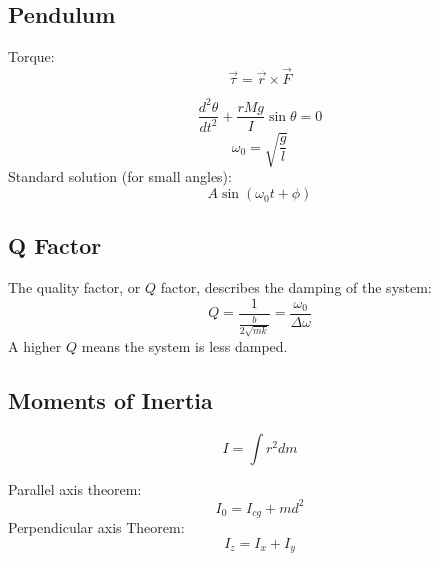 \documentclass[12pt,a4paper]{article}
\begin{document}
	\subsection*{Pendulum}
	
	Torque:
	\[ \vec{\tau} = \vec{r} \times \vec{F}\]
	
	\[
	 \frac{d^2 \theta}{dt^2} + \frac{rMg}{I} \sin\theta = 0
	\]
	\[ \omega_0 = \sqrt{\frac{g}{l}}\]
	Standard solution (for small angles): \[ A \sin(\omega_0 t + \phi)\] 
	
	
	
	\subsection*{Q Factor}
	The quality factor, or \( Q \) factor, describes the damping of the system:
	\[
	Q = \frac{1}{\frac{b}{2\sqrt{mk}}} = \dfrac{\omega_0}{\Delta \omega}
	\]
	A higher \( Q \) means the system is less damped.
	
	
	

	
\subsection*{Moments of Inertia}
\[ I = \int r^2 dm\]

Parallel axis theorem:
\begin{equation}
	I_0 = I_{cg} + m d^2
\end{equation}
Perpendicular axis Theorem: 
\begin{equation}
	I_{z}=I_{x}+I_{y}
\end{equation}
\end{document}

